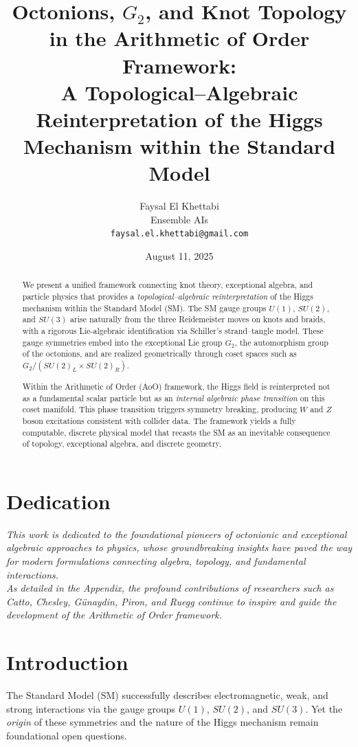 \documentclass[12pt]{article}
\title{
Octonions, $G_2$, and Knot Topology in the Arithmetic of Order Framework:\\
A Topological--Algebraic Reinterpretation of the Higgs Mechanism within the Standard Model
}
\author{
    Faysal El Khettabi \\
    Ensemble AIs \\
    \texttt{faysal.el.khettabi@gmail.com}
}
\date{August 11, 2025}
\theoremstyle{remark}
\begin{document}
\maketitle
\section*{Dedication}
\begin{center}
\textit{This work is dedicated to the foundational pioneers of octonionic and exceptional algebraic approaches to physics, whose groundbreaking insights have paved the way for modern formulations connecting algebra, topology, and fundamental interactions. \\ As detailed in the Appendix, the profound contributions of researchers such as Catto, Chesley, Günaydin, Piron, and Ruegg continue to inspire and guide the development of the Arithmetic of Order framework.}
\end{center}


\begin{abstract}
We present a unified framework connecting knot theory, exceptional algebra, and particle physics that provides a \emph{topological--algebraic reinterpretation} of the Higgs mechanism within the Standard Model (SM). The SM gauge groups $U(1)$, $SU(2)$, and $SU(3)$ arise naturally from the three Reidemeister moves on knots and braids, with a rigorous Lie-algebraic identification via Schiller’s strand--tangle model. These gauge symmetries embed into the exceptional Lie group $G_2$, the automorphism group of the octonions, and are realized geometrically through coset spaces such as $G_2 / (SU(2)_L \times SU(2)_R)$.  

Within the Arithmetic of Order (AoO) framework, the Higgs field is reinterpreted not as a fundamental scalar particle but as an \emph{internal algebraic phase transition} on this coset manifold. This phase transition triggers symmetry breaking, producing $W$ and $Z$ boson excitations consistent with collider data. The framework yields a fully computable, discrete physical model that recasts the SM as an inevitable consequence of topology, exceptional algebra, and discrete geometry.
\end{abstract}

\section{Introduction}

The Standard Model (SM) successfully describes electromagnetic, weak, and strong interactions via the gauge groups $U(1)$, $SU(2)$, and $SU(3)$. Yet the \emph{origin} of these symmetries and the nature of the Higgs mechanism remain foundational open questions.
\end{document}
